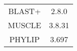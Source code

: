 \caption{\label{tab:software} Software and version specifications within the analysis pipeline.}
\begin{table}
\centering 
    \begin{tabular}{| c | c |}
    \hline
        BLAST+ & 2.8.0 \\
        MUSCLE & 3.8.31 \\ 
        PHYLIP & 3.697 \\ 
    \hline
    \end{tabular}
\end{table}